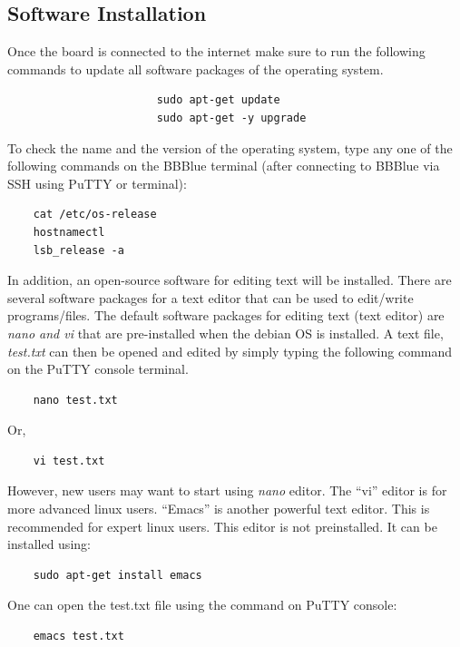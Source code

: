 %

%
%


\subsection{Software Installation}
\label{sec:softwareInstallation}
Once the board is connected to the internet make sure to run the following commands to update all software packages of the operating system. %
%
\begin{verbatim}
                       sudo apt-get update
                       sudo apt-get -y upgrade
\end{verbatim}
%

To check the name and the version of the operating system, type any one of the
following commands on the BBBlue terminal (after connecting to BBBlue via SSH
using PuTTY or terminal): %

\begin{center}
  \begin{verbatim}
    cat /etc/os-release
    hostnamectl
    lsb_release -a
  \end{verbatim}
\end{center}

In addition, an open-source software for editing text will be installed. There
are several software packages for a text editor that can be used to edit/write
programs/files. The default software packages for editing text (text editor) are  
\emph{nano and vi} that are pre-installed when the debian OS is installed. A text file,
\emph{test.txt} can then be opened and edited by simply typing the following
command on the PuTTY console terminal. %
%
\begin{verbatim}
    nano test.txt 
\end{verbatim}
%

Or, 

% 
\begin{verbatim}
    vi test.txt 
\end{verbatim}
%

However, new users may want to start using \emph{nano} editor. The ``vi'' editor
is for more advanced linux users. ``Emacs'' is another powerful text editor. This is recommended for expert linux users. This editor is not preinstalled. It can be installed using:
\begin{verbatim}
    sudo apt-get install emacs 
\end{verbatim}
%
One can open the test.txt file using the command on PuTTY console: 
\begin{verbatim}
    emacs test.txt
\end{verbatim}



